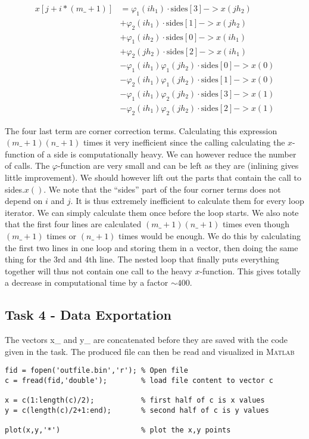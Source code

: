 \documentclass[paper=a4, fontsize=12pt]{article} %
\begin{document}
\begin{align*}
x[j+i*(m\_+1)]  &= \varphi_1(ih_1)\cdot \textrm{sides}[3]->x(jh_2) \\
	&+ \varphi_2(ih_1)\cdot \textrm{sides}[1]->x(jh_2) \\
	&+ \varphi_1(ih_2)\cdot \textrm{sides}[0]->x(ih_1) \\
	&+ \varphi_2(jh_2)\cdot \textrm{sides}[2]->x(ih_1) \\	
	&- \varphi_1(ih_1) \varphi_1(jh_2) \cdot  \textrm{sides}[0]->x(0) \\
	&- \varphi_2(ih_1) \varphi_1(jh_2) \cdot  \textrm{sides}[1]->x(0) \\
	&- \varphi_1(ih_1) \varphi_2(jh_2) \cdot  \textrm{sides}[3]->x(1) \\
	&- \varphi_2(ih_1) \varphi_2(jh_2) \cdot  \textrm{sides}[2]->x(1)
\end{align*}


The four last term are corner correction terms. Calculating this expression $(m\_+1)(n\_+1)$ times it very inefficient since the calling calculating the $x$-function of a side is computationally heavy. We can however reduce the number of calls. The $\varphi$-function are very small and can be left as they are (inlining gives little improvement). We should however lift out the parts that contain the call to sides.$x()$. We note that the ``sides'' part of the four corner terms does not depend on $i$ and $j$. It is thus extremely inefficient to calculate them for every loop iterator. We can simply calculate them once before the loop starts. We also note that the first four lines are calculated $(m\_+1)(n\_+1)$ times even though $(m\_+1)$ times or $(n\_+1)$ times would be enough. We do this by calculating the first two lines in one loop and storing them in a vector, then doing the same thing for the 3rd and 4th line. The nested loop that finally puts everything together will thus not contain one call to the heavy $x$-function. This gives totally a decrease in computational time by a factor $\sim 400$.\\

\subsection*{Task 4 - Data Exportation}

The vectors x\_ and y\_ are concatenated before they are saved with the code given in the task. The produced file can then be read and visualized in \textsc{Matlab} 

\begin{lstlisting}
fid = fopen('outfile.bin','r'); % Open file
c = fread(fid,'double');        % load file content to vector c

x = c(1:length(c)/2);           % first half of c is x values
y = c(length(c)/2+1:end);       % second half of c is y values

plot(x,y,'*')                   % plot the x,y points 
 \end{lstlisting}  
\end{document}
